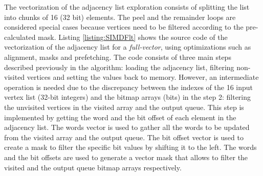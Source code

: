 \documentclass{sig-alternate-05-2015}
\begin{document}
The vectorization of the adjacency list exploration consists of
splitting the list into chunks of 16 (32 bit) elements. The peel and
the remainder loops are considered special cases because vertices need
to be filtered according to the pre-calculated mask. Listing
\ref{listing:SIMDFlt} shows the source code of the vectorization of
the adjacency list for a \textit{full-vector}, using optimizations
such as alignment, masks and prefetching. The code consists of three
main steps described previously in the algorithm: loading the
adjacency list, filtering non-visited vertices and setting the values
back to memory. However, an intermediate operation is needed due to
the discrepancy between the indexes of the 16 input vertex list
(32-bit integers) and the bitmap arrays (bits) in the step 2:
filtering the unvisited vertices in the visited array and the output
queue. This step is implemented by getting the word and the bit offset
of each element in the adjacency list. The words vector is used to
gather all the words to be updated from the visited array and the
output queue. The bit offset vector is used to create a mask to filter
the specific bit values by shifting it to the left. The words and the
bit offsets are used to generate a vector mask that allows to filter
the visited and the output queue bitmap arrays respectively. 
\end{document}
